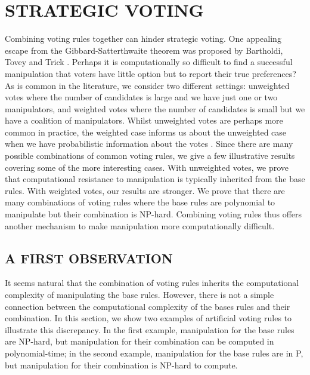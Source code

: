 \documentclass{ecai2012}
\newcommand\lirong[1]{}
\begin{document}
\section{STRATEGIC VOTING}
\vspace{-1mm}
Combining voting rules together
can hinder strategic
voting. One appealing escape from the Gibbard-Satterthwaite
theorem was proposed
by Bartholdi, Tovey and Trick %
\cite{bartholditoveytrick}.
Perhaps it is computationally so difficult to find a successful
manipulation that voters have little
option but to report their true preferences?
As is common in the literature, we consider two
different settings: unweighted votes where
the number of candidates is large and we have
just one or two manipulators, and weighted votes where
the number of candidates is small but we have
a %
coalition of manipulators.
Whilst unweighted votes are perhaps more common
in practice, the weighted case informs
us about the unweighted case when we have probabilistic
information about the votes \cite{csljacm07}.
Since there are many possible combinations of common
voting rules, we give a few illustrative results
covering some of the more interesting cases.
With unweighted votes, we prove that
computational resistance to manipulation is
typically inherited from the base rules.
With weighted votes, our results are stronger.
We prove that there are many combinations
of voting rules where the base rules are
polynomial to manipulate but their
combination is NP-hard. Combining voting
rules thus offers another mechanism to make manipulation
more computationally difficult.

\vspace{-2mm}
\subsection*{A FIRST OBSERVATION}\lirong{The results are not really general so I changed the caption...}
\vspace{-1mm}
It seems natural that the combination of voting
rules inherits the computational complexity of manipulating
the base rules. However, there is not a simple
connection between the computational complexity of the bases rules and their combination.
In this section, we show two examples of artificial voting rules to illustrate this discrepancy. In the first example, manipulation for the base rules are NP-hard, but manipulation for their combination can be computed in polynomial-time; in the second example, manipulation for the base rules are in P, but manipulation for their combination is NP-hard to compute.\lirong{Slightly changed the wording.}
\end{document}
